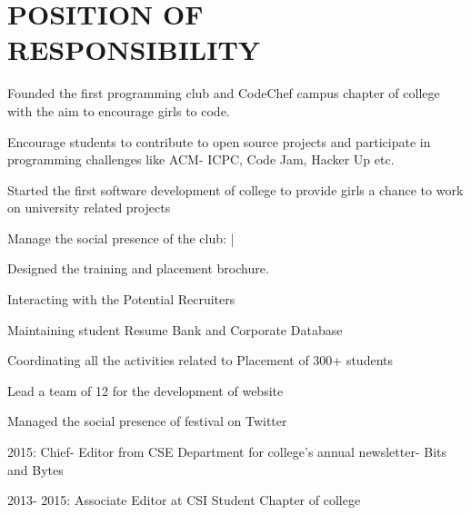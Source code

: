 \documentclass[]{resume-openfont}
\begin{document}
\begin{minipage}[t]{0.66\textwidth}

\section{POSITION OF RESPONSIBILITY}

\begin{tightemize}
\item Founded the first programming club and CodeChef campus chapter of college with the aim to encourage girls to code.
\item Encourage students to contribute to open source projects and participate in programming challenges like ACM- ICPC, Code Jam, Hacker Up etc.
\item Started the first software development of college to provide girls a chance to work on university related projects
\item Manage the social presence of the club:  \href{https://github.com/codebenders-igdtuw}{} |  \href{https://www.facebook.com/CodeBenders/}{}
\end{tightemize}
\sectionsep

\begin{tightemize}
\item Designed the training and placement brochure. 
\item Interacting with the Potential Recruiters
\item Maintaining student Resume Bank and Corporate Database
\item Coordinating all the activities related to Placement of 300+ students
\end{tightemize}
\sectionsep

\begin{tightemize}
\item Lead a team of 12 for the development of website 
\item Managed the social presence of festival on Twitter
\end{tightemize}
\sectionsep

\begin{tightemize}
\item 2015: Chief- Editor from CSE Department for college’s annual newsletter- Bits and Bytes
\item 2013- 2015: Associate Editor at CSI Student Chapter of college 
\end{tightemize}
\sectionsep


\end{minipage}
\end{document}
